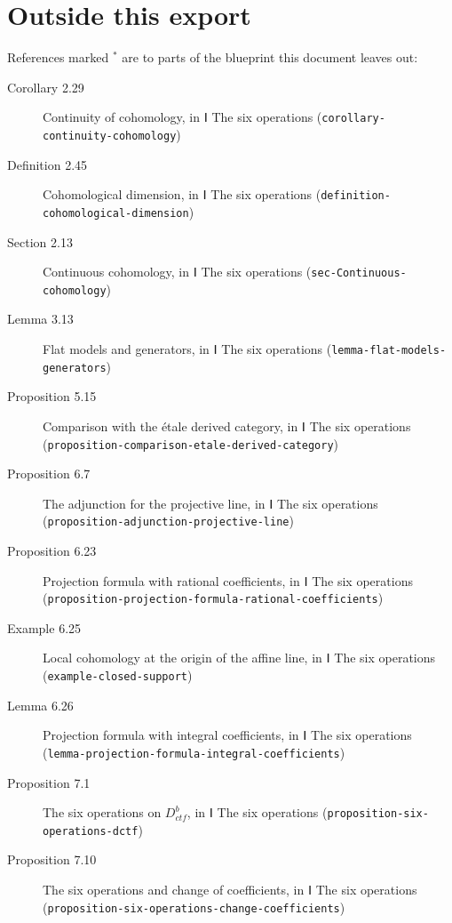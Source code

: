 \documentclass[11pt]{article}
\newcommand{\bpslug}[1]{\texttt{#1}}
\providecommand{\Dctf}{}\renewcommand{\Dctf}{D^b_{ctf}}
\begin{document}
\section*{Outside this export}
References marked \ensuremath{{}^\ast} are to parts of the blueprint this document leaves out:
\begin{description}
\item[Corollary 2.29] Continuity of cohomology, in Ⅰ The six operations (\bpslug{corollary-{}\allowbreak{}continuity-{}\allowbreak{}cohomology})
\item[Definition 2.45] Cohomological dimension, in Ⅰ The six operations (\bpslug{definition-{}\allowbreak{}cohomological-{}\allowbreak{}dimension})
\item[Section 2.13] Continuous cohomology, in Ⅰ The six operations (\bpslug{sec-{}\allowbreak{}Continuous-{}\allowbreak{}cohomology})
\item[Lemma 3.13] Flat models and generators, in Ⅰ The six operations (\bpslug{lemma-{}\allowbreak{}flat-{}\allowbreak{}models-{}\allowbreak{}generators})
\item[Proposition 5.15] Comparison with the étale derived category, in Ⅰ The six operations (\bpslug{proposition-{}\allowbreak{}comparison-{}\allowbreak{}etale-{}\allowbreak{}derived-{}\allowbreak{}category})
\item[Proposition 6.7] The adjunction for the projective line, in Ⅰ The six operations (\bpslug{proposition-{}\allowbreak{}adjunction-{}\allowbreak{}projective-{}\allowbreak{}line})
\item[Proposition 6.23] Projection formula with rational coefficients, in Ⅰ The six operations (\bpslug{proposition-{}\allowbreak{}projection-{}\allowbreak{}formula-{}\allowbreak{}rational-{}\allowbreak{}coefficients})
\item[Example 6.25] Local cohomology at the origin of the affine line, in Ⅰ The six operations (\bpslug{example-{}\allowbreak{}closed-{}\allowbreak{}support})
\item[Lemma 6.26] Projection formula with integral coefficients, in Ⅰ The six operations (\bpslug{lemma-{}\allowbreak{}projection-{}\allowbreak{}formula-{}\allowbreak{}integral-{}\allowbreak{}coefficients})
\item[Proposition 7.1] The six operations on $\Dctf$, in Ⅰ The six operations (\bpslug{proposition-{}\allowbreak{}six-{}\allowbreak{}operations-{}\allowbreak{}dctf})
\item[Proposition 7.10] The six operations and change of coefficients, in Ⅰ The six operations (\bpslug{proposition-{}\allowbreak{}six-{}\allowbreak{}operations-{}\allowbreak{}change-{}\allowbreak{}coefficients})

\end{description}
\end{document}
